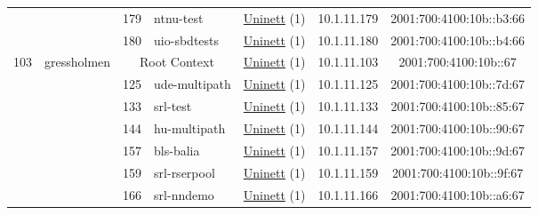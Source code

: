 \begin{small}
\begin{center}
\begin{longtable}{|c|c|c|c|c|c|c|c|}
  &  & \tiny{179} & \multicolumn{1}{|l|}{\tiny{ntnu-test}} & \multicolumn{2}{|c|}{\tiny{\href{https://www.uninett.no}{Uninett} (1)}} & \tiny{10.1.11.179} & \tiny{2001:700:4100:10b::b3:66} \\* \cline{3-3}\cline{4-4}\cline{5-5}\cline{6-6}\cline{7-7}\cline{8-8}
  &  & \tiny{180} & \multicolumn{1}{|l|}{\tiny{uio-sbdtests}} & \multicolumn{2}{|c|}{\tiny{\href{https://www.uninett.no}{Uninett} (1)}} & \tiny{10.1.11.180} & \tiny{2001:700:4100:10b::b4:66} \\ \hline
 \multirow{9}{*}{\tiny{103}} & \multicolumn{1}{|l|}{\multirow{9}{*}{\tiny{gressholmen}}} & \multicolumn{2}{|c|}{\tiny{Root Context}} & \multicolumn{2}{|c|}{\tiny{\href{https://www.uninett.no}{Uninett} (1)}} & \tiny{10.1.11.103} & \tiny{2001:700:4100:10b::67} \\* \cline{3-3}\cline{4-4}\cline{5-5}\cline{6-6}\cline{7-7}\cline{8-8}
  &  & \tiny{125} & \multicolumn{1}{|l|}{\tiny{ude-multipath}} & \multicolumn{2}{|c|}{\tiny{\href{https://www.uninett.no}{Uninett} (1)}} & \tiny{10.1.11.125} & \tiny{2001:700:4100:10b::7d:67} \\* \cline{3-3}\cline{4-4}\cline{5-5}\cline{6-6}\cline{7-7}\cline{8-8}
  &  & \tiny{133} & \multicolumn{1}{|l|}{\tiny{srl-test}} & \multicolumn{2}{|c|}{\tiny{\href{https://www.uninett.no}{Uninett} (1)}} & \tiny{10.1.11.133} & \tiny{2001:700:4100:10b::85:67} \\* \cline{3-3}\cline{4-4}\cline{5-5}\cline{6-6}\cline{7-7}\cline{8-8}
  &  & \tiny{144} & \multicolumn{1}{|l|}{\tiny{hu-multipath}} & \multicolumn{2}{|c|}{\tiny{\href{https://www.uninett.no}{Uninett} (1)}} & \tiny{10.1.11.144} & \tiny{2001:700:4100:10b::90:67} \\* \cline{3-3}\cline{4-4}\cline{5-5}\cline{6-6}\cline{7-7}\cline{8-8}
  &  & \tiny{157} & \multicolumn{1}{|l|}{\tiny{bls-balia}} & \multicolumn{2}{|c|}{\tiny{\href{https://www.uninett.no}{Uninett} (1)}} & \tiny{10.1.11.157} & \tiny{2001:700:4100:10b::9d:67} \\* \cline{3-3}\cline{4-4}\cline{5-5}\cline{6-6}\cline{7-7}\cline{8-8}
  &  & \tiny{159} & \multicolumn{1}{|l|}{\tiny{srl-rserpool}} & \multicolumn{2}{|c|}{\tiny{\href{https://www.uninett.no}{Uninett} (1)}} & \tiny{10.1.11.159} & \tiny{2001:700:4100:10b::9f:67} \\* \cline{3-3}\cline{4-4}\cline{5-5}\cline{6-6}\cline{7-7}\cline{8-8}
  &  & \tiny{166} & \multicolumn{1}{|l|}{\tiny{srl-nndemo}} & \multicolumn{2}{|c|}{\tiny{\href{https://www.uninett.no}{Uninett} (1)}} & \tiny{10.1.11.166} & \tiny{2001:700:4100:10b::a6:67} \\* \cline{3-3}\cline{4-4}\cline{5-5}\cline{6-6}\cline{7-7}\cline{8-8}

\end{longtable}
\end{center}
\end{small}
